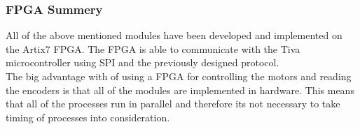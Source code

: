\documentclass[../../../main]{subfiles}
\begin{document}
\subsubsection{FPGA Summery}
All of the above mentioned modules have been developed and implemented on the Artix7 FPGA.
The FPGA is able to communicate with the Tiva microcontroller using SPI and the previously designed protocol.
\\
The big advantage with of using a FPGA for controlling the motors and reading the encoders is that all of the modules are implemented in hardware.
This means that all of the processes run in parallel and therefore its not necessary to take timing of processes into consideration.
\end{document}
